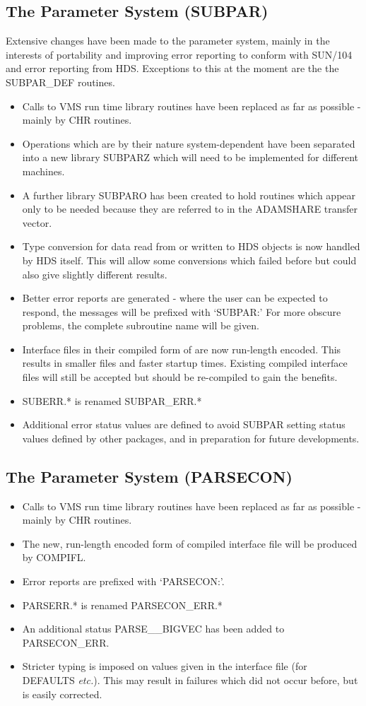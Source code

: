 \subsection{The Parameter System (SUBPAR)}
\label{subpar}
Extensive changes have been made to the parameter system, mainly in the
interests of portability and improving error reporting to conform with SUN/104
and error reporting from HDS.
Exceptions to this at the moment are the the SUBPAR\_DEF routines.
\begin{itemize}
\item Calls to VMS run time library routines have been replaced as far as
possible - mainly by CHR routines.
\item Operations which are by their nature system-dependent have been
separated into a new library SUBPARZ which will need to be implemented for
different machines.
\item A further library SUBPARO has been created to hold routines which appear
only to be needed because they are referred to in the ADAMSHARE transfer
vector.
\item Type conversion for data read from or written to HDS objects is now
handled by HDS itself.
This will allow some conversions which failed before but could also give
slightly different results.
\item Better error reports are generated - where the user can be expected to 
respond, the messages will be prefixed with `SUBPAR:' 
For more obscure problems, the complete subroutine name will be given.
\item Interface files in their compiled form of are now run-length encoded.
This results in smaller files and faster startup times.
Existing compiled interface files will still be accepted but should be
re-compiled to gain the benefits.
\item SUBERR.* is renamed SUBPAR\_ERR.*
\item Additional error status values are defined to avoid SUBPAR setting status
values defined by other packages, and in preparation for future developments.
\end{itemize}

\subsection{The Parameter System (PARSECON)}
\label{parsecon}
\begin{itemize}
\item Calls to VMS run time library routines have been replaced as far as
possible - mainly by CHR routines.
\item The new, run-length encoded form of compiled interface file will be
produced by COMPIFL.
\item Error reports are prefixed with `PARSECON:'.
\item PARSERR.* is renamed PARSECON\_ERR.*
\item An additional status PARSE\_\_BIGVEC has been added to PARSECON\_ERR.
\item Stricter typing is imposed on values given in the interface file
(for DEFAULTS {\em etc.}). This may result in failures which did not occur
before, but is easily corrected.
\end{itemize}

